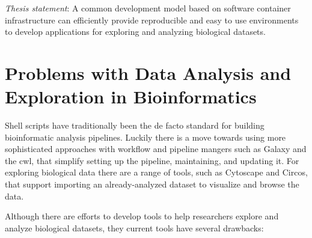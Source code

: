 \emph{Thesis statement}:
A common development model based on software container infrastructure can
efficiently provide reproducible and easy to use environments to develop
applications for exploring and analyzing biological datasets. 

\section{Problems with Data Analysis and Exploration in Bioinformatics}

Shell scripts have traditionally been the de facto standard for building
bioinformatic analysis pipelines. Luckily there is a move towards using more
sophisticated approaches with workflow and pipeline mangers such as
Galaxy\cite{galaxy} and the \gls{cwl}\cite{cwl}, that simplify setting up the
pipeline, maintaining, and updating it. For exploring biological data there are
a range of tools, such as Cytoscape\cite{cytoscape} and Circos\cite{circos},
that support importing an already-analyzed dataset to visualize and browse the
data. 

Although there are efforts to develop tools to help researchers explore and
analyze biological datasets, they current tools have several drawbacks:


